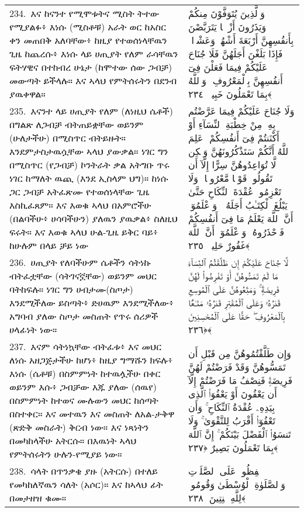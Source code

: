 \documentclass[11pt,a4paper,oneside]{article}%
\newcommand{\mytextarabic}[1]{\textarabic{ #1 \flushright}}
\begin{document}
\begin{longtable}{%
  @{}
    p{}
  @{~~~}
    p{}
    @{}
}
234.\ እና ከናንተ የሚሞቱትና ሚስት ትተው የሚያልፉ፥ እነሱ (ሚስቶቹ) አራት ወር ከአስር ቀን መጠበቅ አለባቸው፥ ከዚያ የተወሰነላቸዉን ጊዜ ከጨረሱ፥ እነሱ ላይ ሀጢያት የለም ራሳቸዉን ፍትሃዊና በተከብረ ሁኔታ (ከሞተው ሰው ጋብቻ) መውጣት ይችላሉ። እና ኣላህ የምትሰሩትን በደንብ ያዉቀዋል። &  \mytextarabic{ وَٱلَّذِينَ يُتَوَفَّوْنَ مِنكُمْ وَيَذَرُونَ أَزْوَٟجًۭا يَتَرَبَّصْنَ بِأَنفُسِهِنَّ أَرْبَعَةَ أَشْهُرٍۢ وَعَشْرًۭا ۖ فَإِذَا بَلَغْنَ أَجَلَهُنَّ فَلَا جُنَاحَ عَلَيْكُمْ فِيمَا فَعَلْنَ فِىٓ أَنفُسِهِنَّ بِٱلْمَعْرُوفِ ۗ وَٱللَّهُ بِمَا تَعْمَلُونَ خَبِيرٌۭ ﴿٢٣٤﴾}\\
235.\ እናንተ ላይ ሀጢያት የለም (ለነዚህ ሴቶች) በግልጽ ለጋብቻ ብትጠይቋቸው ወይንም (ሁለታችሁ) በሚስጥር ብትይዙት። እንደምታስታዉሷቸው ኣላህ ያውቃል። ነገር ግን በሚስጥር (የጋብቻ) ኮንትራት ቃል አትግቡ ጥሩ ነገር ከማለት ዉጪ (እንደ ኢስላም ህግ)። ከነሱ ጋር ጋብቻ አትፈጽሙ የተወሰነላቸው ጊዜ እስኪፈጸም። እና እወቁ ኣላህ በአምሮችሁ (በልባችሁ፥ ሀሳባችሁን) ያለዉን ያዉቃል፥ ስለዚህ ፍሩት። እና እወቁ ኣላህ ሁል-ጊዜ ይቅር ባይ፥ ከሁሉም በላይ ቻይ ነው &  \mytextarabic{وَلَا جُنَاحَ عَلَيْكُمْ فِيمَا عَرَّضْتُم بِهِۦ مِنْ خِطْبَةِ ٱلنِّسَآءِ أَوْ أَكْنَنتُمْ فِىٓ أَنفُسِكُمْ ۚ عَلِمَ ٱللَّهُ أَنَّكُمْ سَتَذْكُرُونَهُنَّ وَلَٟكِن لَّا تُوَاعِدُوهُنَّ سِرًّا إِلَّآ أَن تَقُولُوا۟ قَوْلًۭا مَّعْرُوفًۭا ۚ وَلَا تَعْزِمُوا۟ عُقْدَةَ ٱلنِّكَاحِ حَتَّىٰ يَبْلُغَ ٱلْكِتَـٰبُ أَجَلَهُۥ ۚ وَٱعْلَمُوٓا۟ أَنَّ ٱللَّهَ يَعْلَمُ مَا فِىٓ أَنفُسِكُمْ فَٱحْذَرُوهُ ۚ وَٱعْلَمُوٓا۟ أَنَّ ٱللَّهَ غَفُورٌ حَلِيمٌۭ ﴿٢٣٥﴾}\\
236.\ ሀጢያት የለባችሁም ሴቶችን ሳትነኩ ብትፈቷቸው (ሳትገናኟቸው) ወይንም መህር ባትከፍሉ። ነገር ግን ሀብታሙ(ስጦታ) እንደሚችለው ይስጣት፥ ድሀዉም እንደሚችለው፥ አግባብ ያለው ስጦታ መስጠት የጥሩ ሰሪዎች ሀላፊነት ነው። &  \mytextarabic{لَّا جُنَاحَ عَلَيْكُمْ إِن طَلَّقْتُمُ ٱلنِّسَآءَ مَا لَمْ تَمَسُّوهُنَّ أَوْ تَفْرِضُوا۟ لَهُنَّ فَرِيضَةًۭ ۚ وَمَتِّعُوهُنَّ عَلَى ٱلْمُوسِعِ قَدَرُهُۥ وَعَلَى ٱلْمُقْتِرِ قَدَرُهُۥ مَتَـٰعًۢا بِٱلْمَعْرُوفِ ۖ حَقًّا عَلَى ٱلْمُحْسِنِينَ ﴿٢٣٦﴾}\\
237.\ እናም ሳትነኳቸው ብትፈቱ፥ እና መህር ለነሱ አዘጋጅታችሁ ከሆነ፥ ከዚያ ግማሹን ክፍሉ፥ እነሱ (ሴቶቹ) በስምምነት ከተዉሏችሁ በቀር ወይንም እሱ፥ ጋብቻው እጁ ያለው (ሰዉየ) በስምምነት ከተወና ሙሉውን መህር ከሰጣት በስተቀር። እና መተዉን እና መስጠት ለአል-ታቅዋ (ጽድቅ መስራት) ቅርብ ነው። እና ነጻነትን በመካከላችሁ አትርሱ። በእዉነት ኣላህ የምትሰሩትን ሁሉን-የሚያይ ነው። &  \mytextarabic{وَإِن طَلَّقْتُمُوهُنَّ مِن قَبْلِ أَن تَمَسُّوهُنَّ وَقَدْ فَرَضْتُمْ لَهُنَّ فَرِيضَةًۭ فَنِصْفُ مَا فَرَضْتُمْ إِلَّآ أَن يَعْفُونَ أَوْ يَعْفُوَا۟ ٱلَّذِى بِيَدِهِۦ عُقْدَةُ ٱلنِّكَاحِ ۚ وَأَن تَعْفُوٓا۟ أَقْرَبُ لِلتَّقْوَىٰ ۚ وَلَا تَنسَوُا۟ ٱلْفَضْلَ بَيْنَكُمْ ۚ إِنَّ ٱللَّهَ بِمَا تَعْمَلُونَ بَصِيرٌ ﴿٢٣٧﴾}\\
238.\ ሳላት በጥንቃቄ ያዙ (አትርሱ) በተለይ የመካከለኛዉን ሳለት (አሶር)። እና ከኣላህ ፊት በመታዘዝ ቁሙ። &  \mytextarabic{حَٟفِظُوا۟ عَلَى ٱلصَّلَوَٟتِ وَٱلصَّلَوٰةِ ٱلْوُسْطَىٰ وَقُومُوا۟ لِلَّهِ قَٟنِتِينَ ﴿٢٣٨﴾}\\

\end{longtable}
\end{document}
